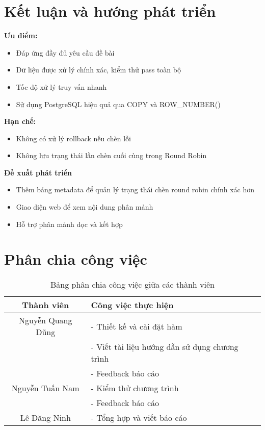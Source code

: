 \documentclass[a4paper]{article}
\begin{document}
\section{Kết luận và hướng phát triển}
\textbf{Ưu điểm:}
\begin{itemize}
    \item Đáp ứng đầy đủ yêu cầu đề bài
    \item Dữ liệu được xử lý chính xác, kiểm thử pass toàn bộ
    \item Tốc độ xử lý truy vấn nhanh
    \item Sử dụng PostgreSQL hiệu quả qua COPY và ROW\_NUMBER()
\end{itemize}
\textbf{Hạn chế:}
\begin{itemize}
    \item Không có xử lý rollback nếu chèn lỗi
    \item Không lưu trạng thái lần chèn cuối cùng trong Round Robin

\end{itemize}
\textbf{Đề xuất phát triển}
\begin{itemize}
    \item Thêm bảng metadata để quản lý trạng thái chèn round robin chính xác hơn
    \item Giao diện web để xem nội dung phân mảnh
    \item Hỗ trợ phân mảnh dọc và kết hợp
\end{itemize}
\clearpage
\section{Phân chia công việc}
\begin{table}[H]
    \centering
    \begin{tabular}{|c|p{8cm}|}
        \hline
        \textbf{Thành viên} & \textbf{Công việc thực hiện} \\
        \hline
        Nguyễn Quang Dũng & 
        - Thiết kế và cài đặt hàm  \\
        & - Viết tài liệu hướng dẫn sử dụng chương trình \\
        & - Feedback báo cáo\\
        \hline
        Nguyễn Tuấn Nam & 
         - Kiểm thử chương trình\\&
         - Feedback báo cáo \\
        \hline
        Lê Đăng Ninh & 
       
        - Tổng hợp và viết báo cáo\\
        \hline
    \end{tabular}
    \caption{Bảng phân chia công việc giữa các thành viên}
\end{table}
\end{document}
